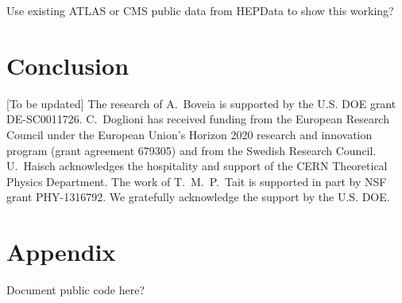 \documentclass[a4paper, 11pt,notoc]{article}
\begin{document}
Use existing ATLAS or CMS public data from HEPData to show this working?


\section{Conclusion}



\acknowledgments 

[To be updated] The research of A.~Boveia is supported by the U.S. DOE grant  DE-SC0011726. C.~Doglioni has received funding from the European Research Council under the European Union's Horizon 2020 research and innovation program (grant agreement 679305) and from the Swedish Research Council. U.~Haisch acknowledges the hospitality and support of the CERN Theoretical Physics Department. The work of T.~M.~P.~Tait is supported in part by NSF grant PHY-1316792. We gratefully acknowledge the support by the U.S. DOE. 


\appendix

\section{Appendix}
\label{app:recast}

Document public code here?

\newpage 

%
%
\end{document}
